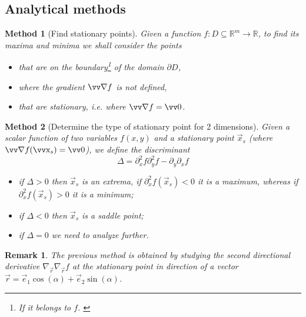 \documentclass[twocolumn, margin=small]{tex/hsrzf}
\theoremstyle{fuvarzf}
\newtheorem{method}{Method}
\newtheorem{remark}{Remark}
\begin{document}
\subsection{Analytical methods}

\begin{method}[Find stationary points]
  Given a function \(f: D \subseteq \mathbb{R}^m \to \mathbb{R}\), to
  find its maxima and minima we shall consider the points
  \begin{itemize}
    \item that are on the boundary\footnote{If it belongs to \(f\).
      \label{ftn:boundary}} of the domain \(\partial D\),
    \item where the gradient \(\grad f\) is not defined,
    \item that are stationary, i.e. where \(\grad f = \vec{0}\).
  \end{itemize}
\end{method}

\begin{method}[Determine the type of stationary point for 2 dimensions]
  Given a scalar function of two variables \(f(x,y)\) and a stationary point
  \(\vec{x}_s\) (where \(\grad f(\vec{x}_s) = \vec{0}\)), we define the
  \emph{discriminant}
  \[
    \Delta = \partial_x^2 f \partial_y^2 f - \partial_y \partial_x f
  \]
  \begin{itemize}
    \item if \(\Delta > 0\) then \(\vec{x}_s\) is an extrema, if \(\partial_x^2
      f(\vec{x}_s) < 0\) it is a maximum, whereas if \(\partial_x^2
      f(\vec{x}_s) > 0\) it is a minimum;

    \item if \(\Delta < 0\) then \(\vec{x}_s\) is a saddle point;

    \item if \(\Delta = 0\) we need to analyze further.
  \end{itemize}
\end{method}

\begin{remark}
  The previous method is obtained by studying the second directional derivative
  \(\nabla_\vec{r}\nabla_\vec{r} f\) at the stationary point in direction of a
  vector \(\vec{r} = \vec{e}_1\cos(\alpha) + \vec{e}_2\sin(\alpha)\).
\end{remark}
\end{document}

